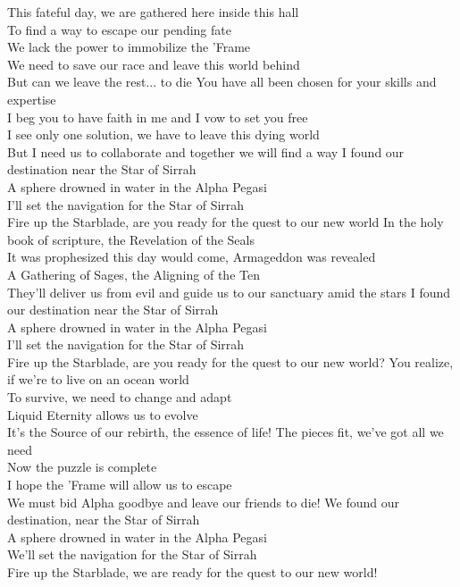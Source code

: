 
This fateful day, we are gathered here inside this hall\\
To find a way to escape our pending fate\\
We lack the power to immobilize the 'Frame\\
We need to save our race and leave this world behind\\
But can we leave the rest... to die
\hop
You have all been chosen for your skills and expertise\\
I beg you to have faith in me and I vow to set you free\\
I see only one solution, we have to leave this dying world\\
But I need us to collaborate and together we will find a way
\hops
{} I found our destination near the Star of Sirrah\\
 A sphere drowned in water in the Alpha Pegasi\\
 I'll set the navigation for the Star of Sirrah\\
 Fire up the Starblade, are you ready for the quest to our new world
\hops
In the holy book of scripture, the Revelation of the Seals\\
It was prophesized this day would come, Armageddon was revealed\\
A Gathering of Sages, the Aligning of the Ten\\
They'll deliver us from evil and guide us to our sanctuary amid the stars
\hops
{} I found our destination near the Star of Sirrah\\
 A sphere drowned in water in the Alpha Pegasi\\
 I'll set the navigation for the Star of Sirrah\\
 Fire up the Starblade, are you ready for the quest to our new world?
\hops
You realize, if we're to live on an ocean world\\
To survive, we need to change and adapt\\
Liquid Eternity allows us to evolve\\
It's the Source of our rebirth, the essence of life!
\hop
The pieces fit, we've got all we need\\
Now the puzzle is complete\\
I hope the 'Frame will allow us to escape\\
We must bid Alpha goodbye and leave our friends to die!
\hops
{} We found our destination, near the Star of Sirrah\\
 A sphere drowned in water in the Alpha Pegasi\\
 We'll set the navigation for the Star of Sirrah\\
 Fire up the Starblade, we are ready for the quest to our new world!

